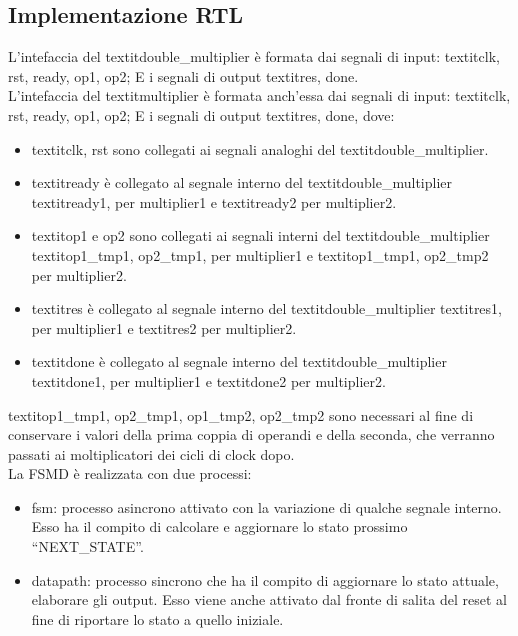 \documentclass[]{IEEEtran}
\begin{document}
\subsection{Implementazione RTL}
L'intefaccia del textit{double\_multiplier} è formata dai segnali di input: textit{clk, rst, ready, op1, op2}; E i segnali di output textit{res, done}. \\
L'intefaccia del textit{multiplier} è formata anch'essa dai segnali di input: textit{clk, rst, ready, op1, op2}; E i segnali di output textit{res, done}, dove:
\begin{itemize}
    \item textit{clk, rst} sono collegati ai segnali analoghi del textit{double\_multiplier}.
    \item textit{ready} è collegato al segnale interno del textit{double\_multiplier} textit{ready1}, per multiplier1 e textit{ready2} per multiplier2.
    \item textit{op1 e op2} sono collegati ai segnali interni del textit{double\_multiplier} textit{op1\_tmp1, op2\_tmp1}, per multiplier1 e textit{op1\_tmp1, op2\_tmp2} per multiplier2.
    \item textit{res} è collegato al segnale interno del textit{double\_multiplier} textit{res1}, per multiplier1 e textit{res2} per multiplier2.
    \item textit{done} è collegato al segnale interno del textit{double\_multiplier} textit{done1}, per multiplier1 e textit{done2} per multiplier2.
\end{itemize}
textit{op1\_tmp1, op2\_tmp1, op1\_tmp2, op2\_tmp2} sono necessari al fine di conservare i valori della prima coppia di operandi e della seconda, che verranno passati ai moltiplicatori dei cicli di clock dopo. \\
La FSMD è realizzata con due processi:
\begin{itemize}
    \item fsm: processo asincrono attivato con la variazione di qualche segnale interno. Esso ha il compito di calcolare e aggiornare lo stato prossimo ``NEXT\_STATE''.
    \item datapath: processo sincrono che ha il compito di aggiornare lo stato attuale, elaborare gli output. Esso viene anche attivato dal fronte di salita del reset al fine di riportare lo stato a quello iniziale.
\end{itemize}
\end{document}
